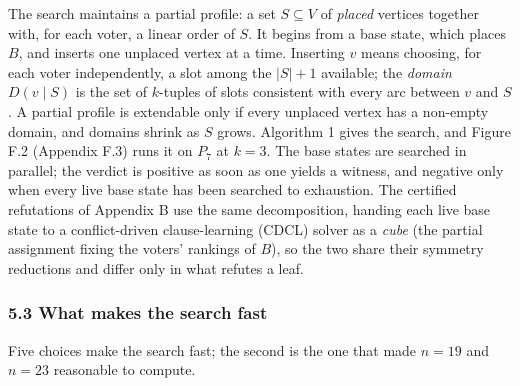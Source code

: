 \documentclass[
]{article}
\begin{document}
The search maintains a partial profile: a set \(S \subseteq V\) of
\emph{placed} vertices together with, for each voter, a linear order of
\(S\). It begins from a base state, which places \(B\), and inserts one
unplaced vertex at a time. Inserting \(v\) means choosing, for each
voter independently, a slot among the \(|S| + 1\) available; the
\emph{domain} \(D(v \mid S)\) is the set of \(k\)-tuples of slots
consistent with every arc between \(v\) and \(S\). A partial profile is
extendable only if every unplaced vertex has a non-empty domain, and
domains shrink as \(S\) grows. Algorithm 1 gives the search, and Figure
F.2 (Appendix F.3) runs it on \(P_7\) at \(k = 3\). The base states are
searched in parallel; the verdict is positive as soon as one yields a
witness, and negative only when every live base state has been searched
to exhaustion. The certified refutations of Appendix B use the same
decomposition, handing each live base state to a conflict-driven
clause-learning (CDCL) solver as a \emph{cube} (the partial assignment
fixing the voters' rankings of \(B\)), so the two share their symmetry
reductions and differ only in what refutes a leaf.

\subsubsection{5.3 What makes the search
fast}\label{what-makes-the-search-fast}

Five choices make the search fast; the second is the one that made
\(n = 19\) and \(n = 23\) reasonable to compute.
\end{document}
